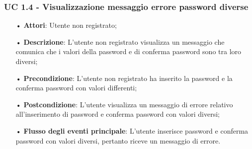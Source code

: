 \subsubsection{UC 1.4 - Visualizzazione messaggio errore password diverse}
\begin{itemize}
	\item[•]\textbf{Attori}: Utente non registrato;
	\item[•]\textbf{Descrizione}: L'utente non registrato visualizza un messaggio che comunica che i valori della password e di conferma password sono tra loro diversi;
	\item[•]\textbf{Precondizione}: L'utente non registrato ha inserito la password e la conferma password con valori differenti;
	\item[•]\textbf{Postcondizione}: L'utente visualizza un messaggio di errore relativo all'inserimento di password e conferma password con valori diversi;
	\item[•]\textbf{Flusso degli eventi principale}: L'utente inserisce password e conferma password con valori diversi, pertanto riceve un messaggio di errore.
\end{itemize}